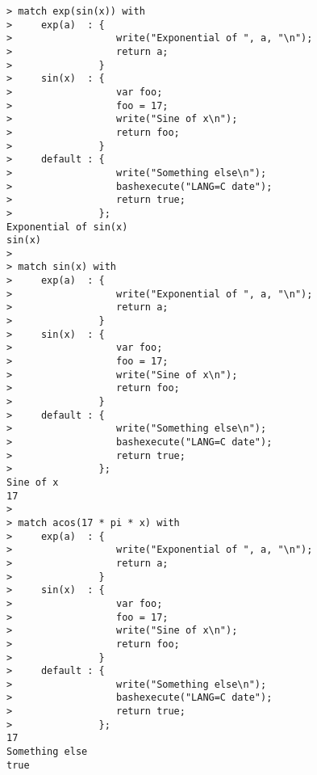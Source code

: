 \begin{center}\begin{minipage}{15cm}\begin{Verbatim}[frame=single]
> match exp(sin(x)) with
>     exp(a)  : { 
>                  write("Exponential of ", a, "\n");
>                  return a;
>               }
>     sin(x)  : {
>                  var foo;
>                  foo = 17;
>                  write("Sine of x\n");
>                  return foo;
>               }
>     default : {
>                  write("Something else\n");
>                  bashexecute("LANG=C date");
>                  return true;
>               };
Exponential of sin(x)
sin(x)
> 
> match sin(x) with
>     exp(a)  : { 
>                  write("Exponential of ", a, "\n");
>                  return a;
>               }
>     sin(x)  : {
>                  var foo;
>                  foo = 17;
>                  write("Sine of x\n");
>                  return foo;
>               }
>     default : {
>                  write("Something else\n");
>                  bashexecute("LANG=C date");
>                  return true;
>               };
Sine of x
17
> 
> match acos(17 * pi * x) with
>     exp(a)  : { 
>                  write("Exponential of ", a, "\n");
>                  return a;
>               }
>     sin(x)  : {
>                  var foo;
>                  foo = 17;
>                  write("Sine of x\n");
>                  return foo;
>               }
>     default : {
>                  write("Something else\n");
>                  bashexecute("LANG=C date");
>                  return true;
>               };
17
Something else
true
\end{Verbatim}
\end{minipage}\end{center}
